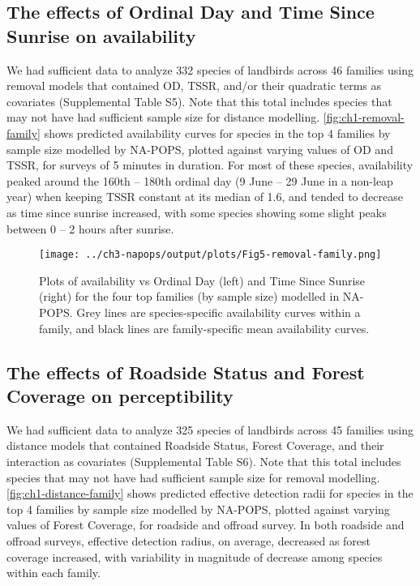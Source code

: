 \subsection{The effects of Ordinal Day and Time Since Sunrise on availability}
\par We had sufficient data to analyze 332 species of landbirds across 46 families using removal models that contained OD, TSSR, and/or their quadratic terms as covariates (Supplemental Table S5). Note that this total includes species that may not have had sufficient sample size for distance modelling. \autoref{fig:ch1-removal-family} shows predicted availability curves for species in the top 4 families by sample size modelled by NA-POPS, plotted against varying values of OD and TSSR, for surveys of 5 minutes in duration. For most of these species, availability peaked around the 160th – 180th ordinal day (9 June – 29 June in a non-leap year) when keeping TSSR constant at its median of 1.6, and tended to decrease as time since sunrise increased, with some species showing some slight peaks between 0 – 2 hours after sunrise. 

\begin{figure}[h]
	\centering
	\texttt{[image: ../ch3-napops/output/plots/Fig5-removal-family.png]}
	\caption{\label{fig:ch1-removal-family}Plots of availability vs Ordinal Day (left) and Time Since Sunrise (right) for the four top families (by sample size) modelled in NA-POPS. Grey lines are species-specific availability curves within a family, and black lines are family-specific mean availability curves.}
\end{figure}

\subsection{The effects of Roadside Status and Forest Coverage on perceptibility}
\par We had sufficient data to analyze 325 species of landbirds across 45 families using distance models that contained Roadside Status, Forest Coverage, and their interaction as covariates (Supplemental Table S6). Note that this total includes species that may not have had sufficient sample size for removal modelling. \autoref{fig:ch1-distance-family} shows predicted effective detection radii for species in the top 4 families by sample size modelled by NA-POPS, plotted against varying values of Forest Coverage, for roadside and offroad survey. In both roadside and offroad surveys, effective detection radius, on average, decreased as forest coverage increased, with variability in magnitude of decrease among species within each family. 

